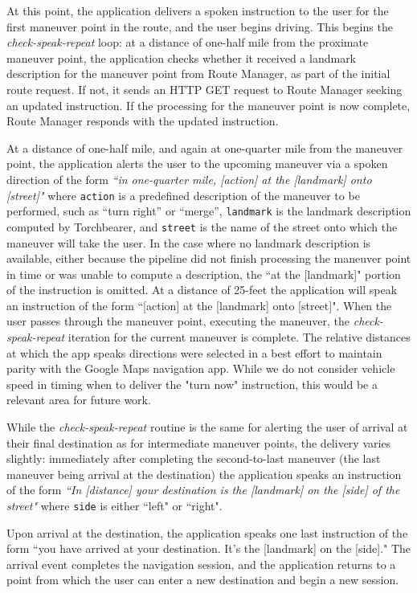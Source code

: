 At this point, the application delivers a spoken instruction to the user for the first maneuver point in the route, and the user begins driving. This begins the \textit{check-speak-repeat} loop: at a distance of one-half mile from the proximate maneuver point, the application checks whether it received a landmark description for the maneuver point from Route Manager, as part of the initial route request. If not, it sends an HTTP GET request to Route Manager seeking an updated instruction. If the processing for the maneuver point is now complete, Route Manager responds with the updated instruction. 

At a distance of one-half mile, and again at one-quarter mile from the maneuver point, the application alerts the user to the upcoming maneuver via a spoken direction of the form \textit{``in one-quarter mile, [action] at the [landmark] onto [street]"} where \texttt{action} is a predefined description of the maneuver to be performed, such as “turn right” or “merge”, \texttt{landmark} is the landmark description computed by Torchbearer, and \texttt{street} is the name of the street onto which the maneuver will take the user. In the case where no landmark description is available, either because the pipeline did not finish processing the maneuver point in time or was unable to compute a description, the ``at the [landmark]" portion of the instruction is omitted. At a distance of 25-feet the application will speak an instruction of the form ``[action] at the [landmark] onto [street]". When the user passes through the maneuver point, executing the maneuver, the \textit{check-speak-repeat} iteration for the current maneuver is complete. The relative distances at which the app speaks directions were selected in a best effort to maintain parity with the Google Maps navigation app. While we do not consider vehicle speed in timing when to deliver the "turn now" instruction, this would be a relevant area for future work.

While the \textit{check-speak-repeat} routine is the same for alerting the user of arrival at their final destination as for intermediate maneuver points, the delivery varies slightly: immediately after completing the second-to-last maneuver (the last maneuver being arrival at the destination) the application speaks an instruction of the form \textit{``In [distance] your destination is the [landmark] on the [side] of the street"} where \texttt{side} is either ``left" or ``right".

Upon arrival at the destination, the application speaks one last instruction of the form ``you have arrived at your destination. It's the [landmark] on the [side]." The arrival event completes the navigation session, and the application returns to a point from which the user can enter a new destination and begin a new session.


